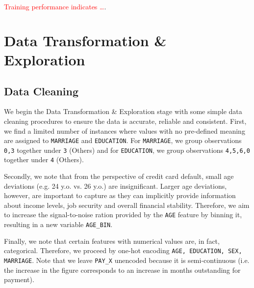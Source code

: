 \documentclass{article}
\newcommand{\code}{\texttt}
\newcommand{\edit}{\textcolor{red}}
\begin{document}
\edit{Training performance indicates \dots}. 


\section{Data Transformation \& Exploration}
\label{sec:data_trans} 

\subsection{Data Cleaning}

We begin the Data Transformation \& Exploration stage with some simple data cleaning procedures to ensure the data is accurate, reliable and consistent. First, we find a limited number of instances where values with no pre-defined meaning are assigned to \code{MARRIAGE} and \code{EDUCATION}. For \code{MARRIAGE}, we group observations \code{0,3} together under \code{3} (Others) and for \code{EDUCATION}, we group observations \code{4,5,6,0} together under \code{4} (Others).

Secondly, we note that from the perspective of credit card default, small age deviations (e.g. 24 y.o. vs. 26 y.o.) are insignificant. Larger age deviations, however, are important to capture as they can implicitly provide information about income levels, job security and overall financial stability. Therefore, we aim to increase the signal-to-noise ration provided by the \code{AGE} feature by binning it, resulting in a new variable \code{AGE\_BIN}.

Finally, we note that certain features with numerical values are, in fact, categorical. Therefore, we proceed by one-hot encoding \code{AGE, EDUCATION, SEX, MARRIAGE}. Note that we leave \code{PAY\_X} unencoded because it is semi-continuous (i.e. the increase in the figure corresponds to an increase in months outstanding for payment).
\end{document}
